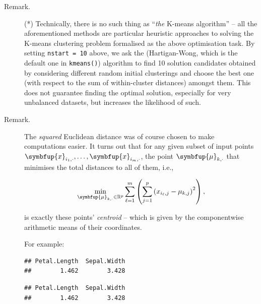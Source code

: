 \documentclass[10pt,b5paper,krantz1]{krantz}
\newenvironment{Shaded}{\begin{snugshade}}{\end{snugshade}}
\newcommand{\CommentTok}[1]{\textcolor[rgb]{0.37,0.37,0.37}{\textit{#1}}}
\newcommand{\DecValTok}[1]{\textcolor[rgb]{0.06,0.06,0.06}{#1}}
\newcommand{\KeywordTok}[1]{\textcolor[rgb]{0.27,0.27,0.27}{\textbf{#1}}}
\newcommand{\NormalTok}[1]{#1}
\newcommand{\OperatorTok}[1]{\textcolor[rgb]{0.43,0.43,0.43}{\textbf{#1}}}
\newcommand{\StringTok}[1]{\textcolor[rgb]{0.5,0.5,0.5}{#1}}
\renewcommand{\mathbf}[1]{\symbfup{#1}}
\renewcommand{\boldsymbol}[1]{\symbfup{#1}}
\begin{document}
\begin{description}
\item[Remark.]
(*) Technically, there is no such thing as ``\emph{the} K-means algorithm'' --
all the aforementioned methods are particular heuristic
approaches to solving the K-means
clustering problem formalised as the above optimisation task.
By setting \texttt{nstart\ =\ 10} above, we ask the (Hartigan-Wong, which is
the default one in \texttt{kmeans()}) algorithm
to find 10 solution candidates obtained by considering different random
initial clusterings and choose the best one (with respect to the sum
of within-cluster distances) amongst them. This does not guarantee
finding the optimal solution, especially for very unbalanced datasets,
but increases the likelihood of such.
\item[Remark.]
The \emph{squared} Euclidean distance was of course chosen to make computations
easier. It turns out that for any given subset of input points
\(\mathbf{x}_{i_1,\cdot},\dots,\mathbf{x}_{i_m,\cdot}\),
the point \(\boldsymbol\mu_{k,\cdot}\) that minimises the total distances
to all of them, i.e.,

\[
    \min_{\boldsymbol\mu_{k,\cdot}\in \mathbb{R}^p}
    \sum_{\ell=1}^m \left(
    \sum_{j=1}^p \left(x_{i_\ell,j}-\mu_{k,j}\right)^2
    \right),
\]

is exactly these points' \emph{centroid} -- which is given by
the componentwise arithmetic means of their coordinates.

For example:

\begin{Shaded}
\end{Shaded}

\begin{verbatim}
## Petal.Length  Sepal.Width 
##        1.462        3.428
\end{verbatim}

\begin{Shaded}
\end{Shaded}

\begin{verbatim}
## Petal.Length  Sepal.Width 
##        1.462        3.428
\end{verbatim}
\end{description}
\end{document}
